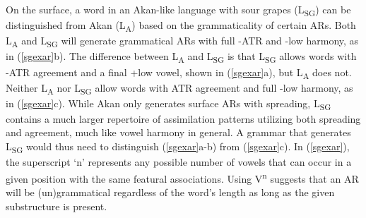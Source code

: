 \documentclass[,doc,floatsintext]{apa6}
\theoremstyle{definition}
\theoremstyle{definition}
\theoremstyle{definition}
\theoremstyle{remark}
\begin{document}
On the surface, a word in an Akan-like language with sour grapes
(L\textsubscript{SG}) can be distinguished from Akan
(L\textsubscript{A}) based on the grammaticality of certain ARs. Both
L\textsubscript{A} and L\textsubscript{SG} will generate grammatical ARs
with full -ATR and -low harmony, as in (\ref{sgexar}b). The difference
between L\textsubscript{A} and L\textsubscript{SG} is that
L\textsubscript{SG} allows words with -ATR agreement and a final +low
vowel, shown in (\ref{sgexar}a), but L\textsubscript{A} does not.
Neither L\textsubscript{A} nor L\textsubscript{SG} allow words with ATR
agreement and full -low harmony, as in (\ref{sgexar}c). While Akan only
generates surface ARs with spreading, L\textsubscript{SG} contains a
much larger repertoire of assimilation patterns utilizing both spreading
and agreement, much like vowel harmony in general. A grammar that
generates L\textsubscript{SG} would thus need to distinguish
(\ref{sgexar}a-b) from (\ref{sgexar}c). In (\ref{sgexar}), the
superscript `n' represents any possible number of vowels that can occur
in a given position with the same featural associations. Using
V\textsuperscript{n} suggests that an AR will be (un)grammatical
regardless of the word's length as long as the given substructure is
present.

\begin{exe}
\label{sgexar} \\
\end{exe}
\end{document}
